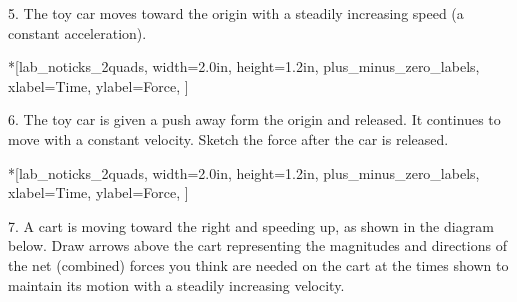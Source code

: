 5. The toy car moves toward the origin with a steadily increasing speed (a
constant acceleration).

\begin{lab_axis}*[lab_noticks_2quads,
	width=2.0in,  height=1.2in,
	plus_minus_zero_labels,
	xlabel=Time,
	ylabel=Force,
	]
\end{lab_axis}

6. The toy car is given a push away form the origin and released. It continues
to move with a constant velocity. Sketch the force after the car is released.

\begin{lab_axis}*[lab_noticks_2quads,
	width=2.0in,  height=1.2in,
	plus_minus_zero_labels,
	xlabel=Time,
	ylabel=Force,
	]
\end{lab_axis}

7. A cart is moving toward the right and speeding up, as shown in the diagram
below. Draw arrows above the cart representing the magnitudes and directions
of the net (combined) forces you think are needed on the cart at the times shown
to maintain its motion with a steadily increasing velocity.

